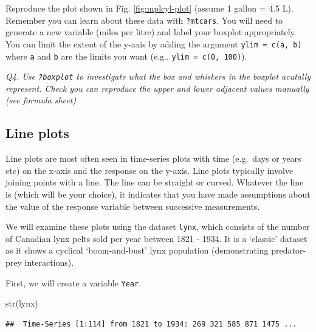 \documentclass[
  11pt,
  a4paper,
]{book}
\newenvironment{Shaded}{\begin{snugshade}}{\end{snugshade}}
\newcommand{\AttributeTok}[1]{\textcolor[rgb]{0.77,0.63,0.00}{#1}}
\newcommand{\CommentTok}[1]{\textcolor[rgb]{0.56,0.35,0.01}{\textit{#1}}}
\newcommand{\DecValTok}[1]{\textcolor[rgb]{0.00,0.00,0.81}{#1}}
\newcommand{\FunctionTok}[1]{\textcolor[rgb]{0.00,0.00,0.00}{#1}}
\newcommand{\NormalTok}[1]{#1}
\newcommand{\OtherTok}[1]{\textcolor[rgb]{0.56,0.35,0.01}{#1}}
\newcommand{\SpecialCharTok}[1]{\textcolor[rgb]{0.00,0.00,0.00}{#1}}
\begin{document}
Reproduce the plot shown in Fig. \ref{fig:mplcyl-plot} (assume 1 gallon = 4.5 L). Remember you can learn about these data with \texttt{?mtcars}. You will need to generate a new variable (miles per litre) and label your boxplot appropriately. You can limit the extent of the y-axis by adding the argument \texttt{ylim\ =\ c(a,\ b)} where \texttt{a} and \texttt{b} are the limits you want (e.g., \texttt{ylim\ =\ c(0,\ 100)}).

\emph{Q4. Use \texttt{?boxplot} to investigate what the box and whiskers in the boxplot acutally represent. Check you can reproduce the upper and lower adjacent values manually (see formula sheet)}

\hypertarget{line-plots}{%
\subsection{Line plots}\label{line-plots}}

Line plots are most often seen in time-series plots with time (e.g.~days or years etc) on the x-axis and the response on the y-axis. Line plots typically involve joining points with a line. The line can be straight or curved. Whatever the line is (which will be your choice), it indicates that you have made assumptions about the value of the response variable between successive measurements.

We will examine these plots using the dataset \texttt{lynx}, which consists of the number of Canadian lynx pelts sold per year between 1821 - 1934. It is a `classic' dataset as it shows a cyclical `boom-and-bust' lynx population (demonstrating predator-prey interactions).

First, we will create a variable \texttt{Year}.

\begin{Shaded}
\begin{Highlighting}[]
\FunctionTok{str}\NormalTok{(lynx)}
\end{Highlighting}
\end{Shaded}

\begin{verbatim}
##  Time-Series [1:114] from 1821 to 1934: 269 321 585 871 1475 ...
\end{verbatim}

\begin{Shaded}
\end{Shaded}
\end{document}
